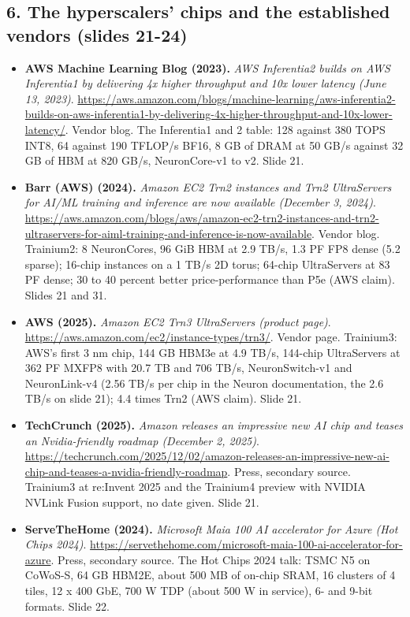 \subsection*{6. The hyperscalers' chips and the established vendors (slides 21-24)}
\begin{itemize}[leftmargin=1.2em,itemsep=3pt]\sloppy
\item \textbf{AWS Machine Learning Blog (2023).} \textit{AWS Inferentia2 builds on AWS Inferentia1 by delivering 4x higher throughput and 10x lower latency (June 13, 2023)}. \url{https://aws.amazon.com/blogs/machine-learning/aws-inferentia2-builds-on-aws-inferentia1-by-delivering-4x-higher-throughput-and-10x-lower-latency/}. Vendor blog. The Inferentia1 and 2 table: 128 against 380 TOPS INT8, 64 against 190 TFLOP/s BF16, 8 GB of DRAM at 50 GB/s against 32 GB of HBM at 820 GB/s, NeuronCore-v1 to v2. Slide 21.
\item \textbf{Barr (AWS) (2024).} \textit{Amazon EC2 Trn2 instances and Trn2 UltraServers for AI/ML training and inference are now available (December 3, 2024)}. \url{https://aws.amazon.com/blogs/aws/amazon-ec2-trn2-instances-and-trn2-ultraservers-for-aiml-training-and-inference-is-now-available}. Vendor blog. Trainium2: 8 NeuronCores, 96 GiB HBM at 2.9 TB/s, 1.3 PF FP8 dense (5.2 sparse); 16-chip instances on a 1 TB/s 2D torus; 64-chip UltraServers at 83 PF dense; 30 to 40 percent better price-performance than P5e (AWS claim). Slides 21 and 31.
\item \textbf{AWS (2025).} \textit{Amazon EC2 Trn3 UltraServers (product page)}. \url{https://aws.amazon.com/ec2/instance-types/trn3/}. Vendor page. Trainium3: AWS's first 3 nm chip, 144 GB HBM3e at 4.9 TB/s, 144-chip UltraServers at 362 PF MXFP8 with 20.7 TB and 706 TB/s, NeuronSwitch-v1 and NeuronLink-v4 (2.56 TB/s per chip in the Neuron documentation, the 2.6 TB/s on slide 21); 4.4 times Trn2 (AWS claim). Slide 21.
\item \textbf{TechCrunch (2025).} \textit{Amazon releases an impressive new AI chip and teases an Nvidia-friendly roadmap (December 2, 2025)}. \url{https://techcrunch.com/2025/12/02/amazon-releases-an-impressive-new-ai-chip-and-teases-a-nvidia-friendly-roadmap}. Press, secondary source. Trainium3 at re:Invent 2025 and the Trainium4 preview with NVIDIA NVLink Fusion support, no date given. Slide 21.
\item \textbf{ServeTheHome (2024).} \textit{Microsoft Maia 100 AI accelerator for Azure (Hot Chips 2024)}. \url{https://servethehome.com/microsoft-maia-100-ai-accelerator-for-azure}. Press, secondary source. The Hot Chips 2024 talk: TSMC N5 on CoWoS-S, 64 GB HBM2E, about 500 MB of on-chip SRAM, 16 clusters of 4 tiles, 12 x 400 GbE, 700 W TDP (about 500 W in service), 6- and 9-bit formats. Slide 22.

\end{itemize}
